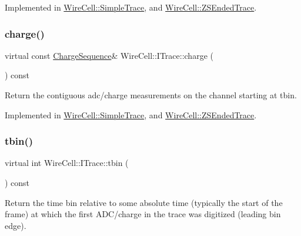 Implemented in \hyperlink{class_wire_cell_1_1_simple_trace_ab88d78ce49eb45b395fb5411905ae010}{Wire\+Cell\+::\+Simple\+Trace}, and \hyperlink{class_wire_cell_1_1_z_s_ended_trace_ac873750a7a0d47c320050561e8608a0a}{Wire\+Cell\+::\+Z\+S\+Ended\+Trace}.

\mbox{\label{class_wire_cell_1_1_i_trace_a55a746bfec82aa0214f0462ae28476e0}} 
\subsubsection{\texorpdfstring{charge()}{charge()}}
{\footnotesize\ttfamily virtual const \hyperlink{class_wire_cell_1_1_i_trace_a3dab103257bc46bfd486966f69836954}{Charge\+Sequence}\& Wire\+Cell\+::\+I\+Trace\+::charge (\begin{DoxyParamCaption}{ }\end{DoxyParamCaption}) const\hspace{0.3cm}{\ttfamily [pure virtual]}}

Return the contiguous adc/charge measurements on the channel starting at tbin. 

Implemented in \hyperlink{class_wire_cell_1_1_simple_trace_a961cf4538022571bfcc24895c2c45cb4}{Wire\+Cell\+::\+Simple\+Trace}, and \hyperlink{class_wire_cell_1_1_z_s_ended_trace_ab2434cf1397e2bc111fd44ffd0afe75e}{Wire\+Cell\+::\+Z\+S\+Ended\+Trace}.

\mbox{\label{class_wire_cell_1_1_i_trace_ab8ffd89fdf73ef4b7b55af2f9c4312df}} 
\subsubsection{\texorpdfstring{tbin()}{tbin()}}
{\footnotesize\ttfamily virtual int Wire\+Cell\+::\+I\+Trace\+::tbin (\begin{DoxyParamCaption}{ }\end{DoxyParamCaption}) const\hspace{0.3cm}{\ttfamily [pure virtual]}}

Return the time bin relative to some absolute time (typically the start of the frame) at which the first A\+D\+C/charge in the trace was digitized (leading bin edge). 

